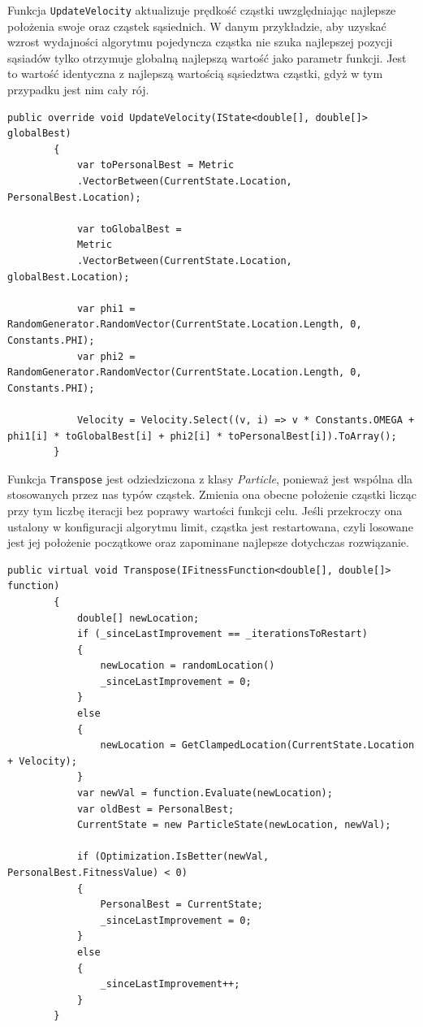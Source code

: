 \documentclass[12pt, twoside, openany, abstract=on]{report}
\theoremstyle{definition}
\begin{document}
Funkcja \texttt{UpdateVelocity} aktualizuje prędkość cząstki uwzględniając najlepsze położenia swoje oraz cząstek sąsiednich. W danym przykładzie, aby uzyskać wzrost wydajności algorytmu pojedyncza cząstka nie szuka najlepszej pozycji sąsiadów tylko otrzymuje globalną najlepszą wartość jako parametr funkcji. Jest to wartość identyczna z najlepszą wartością sąsiedztwa cząstki, gdyż w tym przypadku jest nim cały rój.

\lstset{style=sharpc}
\begin{lstlisting}[frame=single]
        public override void UpdateVelocity(IState<double[], double[]> globalBest)
        {
            var toPersonalBest = Metric
            .VectorBetween(CurrentState.Location, PersonalBest.Location);
            
            var toGlobalBest = 
            Metric
            .VectorBetween(CurrentState.Location, globalBest.Location);

            var phi1 = RandomGenerator.RandomVector(CurrentState.Location.Length, 0, Constants.PHI);
            var phi2 = RandomGenerator.RandomVector(CurrentState.Location.Length, 0, Constants.PHI);

            Velocity = Velocity.Select((v, i) => v * Constants.OMEGA + phi1[i] * toGlobalBest[i] + phi2[i] * toPersonalBest[i]).ToArray();
        }

\end{lstlisting}

Funkcja \texttt{Transpose} jest odziedziczona z klasy \textit{Particle}, ponieważ jest wspólna dla stosowanych przez nas typów cząstek. Zmienia ona obecne położenie cząstki licząc przy tym liczbę iteracji bez poprawy wartości funkcji celu. Jeśli przekroczy ona ustalony w konfiguracji algorytmu limit, cząstka jest restartowana, czyli losowane jest jej położenie początkowe oraz zapominane najlepsze dotychczas rozwiązanie.

\lstset{style=sharpc}
\begin{lstlisting}[frame=single]
public virtual void Transpose(IFitnessFunction<double[], double[]> function)
        {
            double[] newLocation;
            if (_sinceLastImprovement == _iterationsToRestart)
            {
                newLocation = randomLocation()
                _sinceLastImprovement = 0;
            }
            else
            {
                newLocation = GetClampedLocation(CurrentState.Location + Velocity);
            }
            var newVal = function.Evaluate(newLocation);
            var oldBest = PersonalBest;
            CurrentState = new ParticleState(newLocation, newVal);

            if (Optimization.IsBetter(newVal, PersonalBest.FitnessValue) < 0)
            {
                PersonalBest = CurrentState;
                _sinceLastImprovement = 0;
            }
            else
            {
                _sinceLastImprovement++;
            }
        }
\end{lstlisting}
\end{document}

